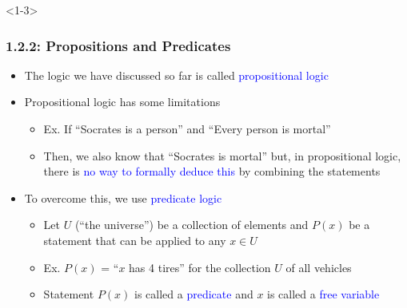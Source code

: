 \documentclass[10pt,english,aspectratio=169]{beamer}
\begin{document}
\begin{frame}<1-3> \frametitle{1.2.2: Propositions and Predicates}

\begin{itemize}
\setlength\itemsep{4mm}
\item<1-> The logic we have discussed so far is called \textcolor{blue}{propositional logic}

\item<2-> Propositional logic has some limitations  \vspace{1mm}
\begin{itemize}
 \setlength\itemsep{1.5mm}
 \item Ex. If ``Socrates is a person'' and ``Every person is mortal''
 \item Then, we also know that ``Socrates is mortal'' but, in propositional logic, there is \textcolor{blue}{no way to formally deduce this} by combining the statements 
\end{itemize}

\item<3-> To overcome this, we use \textcolor{blue}{predicate logic} \vspace{1mm}
\begin{itemize}
 \setlength\itemsep{1.5mm}
 \item Let $U$ (``the universe'') be a collection of elements and $P(x)$ be a statement that can be applied to any $x\in U$
 \item Ex. $P(x)$ = ``$x$ has 4 tires'' for the collection $U$ of all vehicles
 \item Statement $P(x)$ is called a \textcolor{blue}{predicate} and $x$ is called a \textcolor{blue}{free variable}
\end{itemize}
\end{itemize}


\end{frame}
\end{document}
